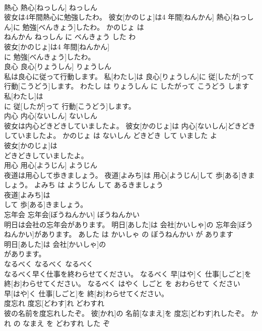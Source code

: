\documentclass[8pt]{extreport}
\begin{document}
\begin{CJK}{UTF8}{min}
\\	熱心	熱心[ねっしん]	ねっしん	
\\	彼女は4年間熱心に勉強したわ。	彼女[かのじょ]は4 年間[ねんかん] 熱心[ねっしん]に 勉強[べんきょう]したわ。	かのじょ は 
\\	ねんかん ねっしん に べんきょう した わ	
\\	彼女[かのじょ]は4 年間[ねんかん]
\\	に 勉強[べんきょう]したわ。			
\\	良心	良心[りょうしん]	りょうしん	
\\	私は良心に従って行動します。	私[わたし]は 良心[りょうしん]に 従[したが]って 行動[こうどう]します。	わたし は りょうしん に したがって こうどう します	
\\	私[わたし]は
\\	に 従[したが]って 行動[こうどう]します。			
\\	内心	内心[ないしん]	ないしん	
\\	彼女は内心どきどきしていましたよ。	彼女[かのじょ]は 内心[ないしん]どきどきしていましたよ。	かのじょ は ないしん どきどき して いました よ	
\\	彼女[かのじょ]は
\\	どきどきしていましたよ。			
\\	用心	用心[ようじん]	ようじん	
\\	夜道は用心して歩きましょう。	夜道[よみち]は 用心[ようじん]して 歩[ある]きましょう。	よみち は ようじん して あるきましょう	
\\	夜道[よみち]は
\\	して 歩[ある]きましょう。			
\\	忘年会	忘年会[ぼうねんかい]	ぼうねんかい	
\\	明日は会社の忘年会があります。	明日[あした]は 会社[かいしゃ]の 忘年会[ぼうねんかい]があります。	あした は かいしゃ の ぼうねんかい が あります	
\\	明日[あした]は 会社[かいしゃ]の
\\	があります。			
\\	なるべく	なるべく	なるべく	
\\	なるべく早く仕事を終わらせてください。	なるべく 早[はや]く 仕事[しごと]を 終[お]わらせてください。	なるべく はやく しごと を おわらせて ください	
\\	早[はや]く 仕事[しごと]を 終[お]わらせてください。			
\\	度忘れ	度忘[どわす]れ	どわすれ	
\\	彼の名前を度忘れしたぞ。	彼[かれ]の 名前[なまえ]を 度忘[どわす]れしたぞ。	かれ の なまえ を どわすれ した ぞ	

\end{CJK}
\end{document}
